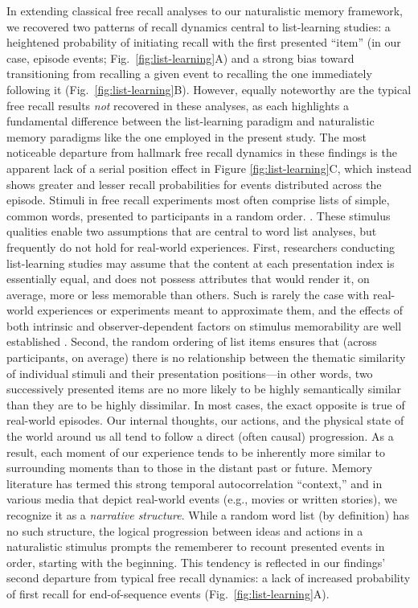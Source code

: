 In extending classical free recall analyses to our naturalistic memory framework, we recovered two patterns of recall dynamics central to list-learning studies: a heightened probability of initiating recall with the first presented ``item'' (in our case, episode events; Fig.~\ref{fig:list-learning}A) and a strong bias toward transitioning from recalling a given event to recalling the one immediately following it (Fig.~\ref{fig:list-learning}B).  However, equally noteworthy are the typical free recall results \textit{not} recovered in these analyses, as each highlights a fundamental difference between the list-learning paradigm and naturalistic memory paradigms like the one employed in the present study.  The most noticeable departure from hallmark free recall dynamics in these findings is the apparent lack of a serial position effect in Figure \ref{fig:list-learning}C, which instead shows greater and lesser recall probabilities for events distributed across the episode.  Stimuli in free recall experiments most often comprise lists of simple, common words, presented to participants in a random order. \citep[In fact, numerous word pools have been developed based on these criteria; e.g.,][]{FrieEtal82}.  These stimulus qualities enable two assumptions that are central to word list analyses, but frequently do not hold for real-world experiences.  First, researchers conducting list-learning studies may assume that the content at each presentation index is essentially equal, and does not possess attributes that would render it, on average, more or less memorable than others.  Such is rarely the case with real-world experiences or experiments meant to approximate them, and the effects of both intrinsic and observer-dependent factors on stimulus memorability are well established \citep[for review see][]{ChunTurk07, ByliEtal15, TyngEtal17}.  Second, the random ordering of list items ensures that (across participants, on average) there is no relationship between the thematic similarity of individual stimuli and their presentation positions---in other words, two successively presented items are no more likely to be highly semantically similar than they are to be highly dissimilar.  In most cases, the exact opposite is true of real-world episodes.  Our internal thoughts, our actions, and the physical state of the world around us all tend to follow a direct (often causal) progression.  As a result, each moment of our experience tends to be inherently more similar to surrounding moments than to those in the distant past or future.  Memory literature has termed this strong temporal autocorrelation ``context,'' and in various media that depict real-world events (e.g., movies or written stories), we recognize it as a \textit{narrative structure}.  While a random word list (by definition) has no such structure, the logical progression between ideas and actions in a naturalistic stimulus prompts the rememberer to recount presented events in order, starting with the beginning.  This tendency is reflected in our findings' second departure from typical free recall dynamics: a lack of increased probability of first recall for end-of-sequence events (Fig.~\ref{fig:list-learning}A).


